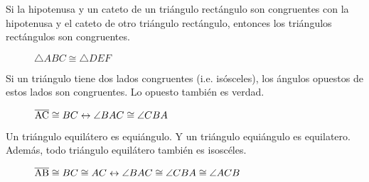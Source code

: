 \clearpage

\begin{postulate}
    Si la hipotenusa y un cateto de un triángulo rectángulo son congruentes con la hipotenusa y el cateto de otro triángulo rectángulo, entonces los triángulos rectángulos son congruentes.

    \begin{figure}[h!]

        \centering

        \begin{subfigure}[b]{.5\textwidth}
            \centering
            
            \label{fig:triang-cong-hc-1}
        \end{subfigure}%
        \begin{subfigure}[b]{.5\textwidth}
            \centering
            
            \label{fig:triang-cong-hc-2}
        \end{subfigure}

        \centering
        \caption{$\triangle{ABC} \cong \triangle{DEF}$}
        \label{fig:triang-cong-hc}
        
    \end{figure}    
        
\end{postulate}

\begin{theorem}
    Si un triángulo tiene dos lados congruentes (i.e. isósceles), los ángulos opuestos de estos lados son congruentes. Lo opuesto también es verdad.

        \begin{figure}[!h]
            \centering
            
            \label{fig:triang-cong-isosceles}
            \caption{$\overline{\rm AC} \cong {BC} \leftrightarrow \angle{BAC} \cong \angle{CBA}$}            
        \end{figure}
\end{theorem}

\begin{theorem}
    Un triángulo equilátero es equiángulo. Y un triángulo equiángulo es equilatero. Además, todo triángulo equilátero también es isoscéles.

    \begin{figure}[!h]
        \centering
        
        \label{fig:traing-cong-equilatero}
        \caption{$\overline{\rm AB} \cong {BC}  \cong {AC} \leftrightarrow \angle{BAC} \cong \angle{CBA} \cong \angle{ACB}$}            
    \end{figure}
    
\end{theorem}

